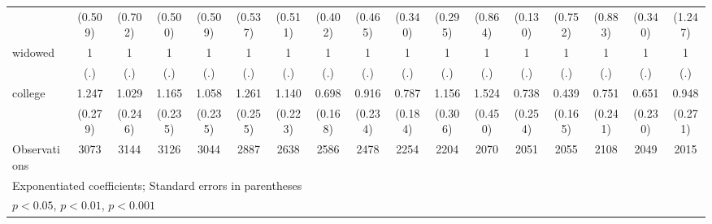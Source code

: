 {\begin{tabular}{l*{16}{c}}
                    &     (0.509)         &     (0.702)         &     (0.500)         &     (0.509)         &     (0.537)         &     (0.511)         &     (0.402)         &     (0.465)         &     (0.340)         &     (0.295)         &     (0.864)         &     (0.130)         &     (0.752)         &     (0.883)         &     (0.340)         &     (1.247)         \\
[1em]
widowed             &           1         &           1         &           1         &           1         &           1         &           1         &           1         &           1         &           1         &           1         &           1         &           1         &           1         &           1         &           1         &           1         \\
                    &         (.)         &         (.)         &         (.)         &         (.)         &         (.)         &         (.)         &         (.)         &         (.)         &         (.)         &         (.)         &         (.)         &         (.)         &         (.)         &         (.)         &         (.)         &         (.)         \\
[1em]
college             &       1.247         &       1.029         &       1.165         &       1.058         &       1.261         &       1.140         &       0.698         &       0.916         &       0.787         &       1.156         &       1.524         &       0.738         &       0.439\sym{*}  &       0.751         &       0.651         &       0.948         \\
                    &     (0.279)         &     (0.246)         &     (0.235)         &     (0.235)         &     (0.255)         &     (0.223)         &     (0.168)         &     (0.234)         &     (0.184)         &     (0.306)         &     (0.450)         &     (0.254)         &     (0.165)         &     (0.241)         &     (0.230)         &     (0.271)         \\
\hline
Observations        &        3073         &        3144         &        3126         &        3044         &        2887         &        2638         &        2586         &        2478         &        2254         &        2204         &        2070         &        2051         &        2055         &        2108         &        2049         &        2015         \\
\hline\hline
\multicolumn{17}{l}{\footnotesize Exponentiated coefficients; Standard errors in parentheses}\\
\multicolumn{17}{l}{\footnotesize \sym{*} \(p<0.05\), \sym{**} \(p<0.01\), \sym{***} \(p<0.001\)}\\
\end{tabular}
}
